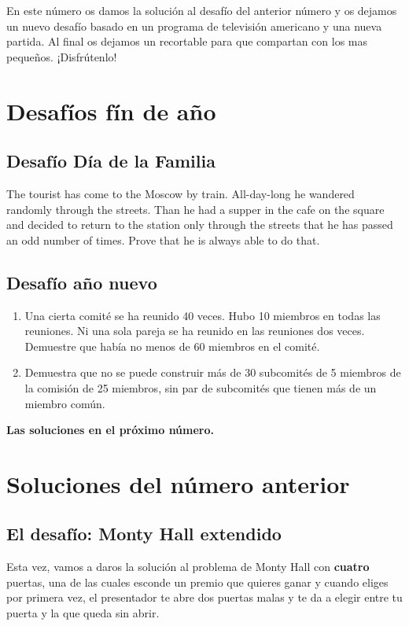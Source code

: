 \begin{multicols}{2}

  \cappar En este número os damos la solución al desafío del anterior número y os dejamos un nuevo desafío basado en un programa de televisión americano y una nueva partida. Al final os dejamos un recortable para que compartan con los mas pequeños. ¡Disfrútenlo!


\section*{Desafíos fín de año}
\subsection{Desafío Día de la Familia}
The tourist has come to the Moscow by train.  All-day-long he wandered
randomly through the streets.  Than he had a supper in the cafe on the
square and decided to return to the station only through the streets
that he has passed an odd number of times.
Prove that he is always able to do that.
\subsection{Desafío año nuevo}
\begin{enumerate}
\item Una cierta comité se ha reunido 40 veces. Hubo 10 miembros en
todas las reuniones. Ni una sola pareja se ha reunido en las reuniones dos veces.
Demuestre que había no menos de 60 miembros en el comité.
\item Demuestra que no se puede construir más de 30 subcomités de 5 miembros de la comisión de 25 miembros, sin par de subcomités que tienen más de un miembro común.
\end{enumerate}
{\bf Las soluciones en el próximo número.}
\section*{\textcolor{redsol}{Soluciones del número anterior}}
\subsection{El desafío: Monty Hall extendido}
Esta vez, vamos a daros la solución al problema de Monty Hall con \textbf{cuatro} puertas, una de las cuales esconde un premio que quieres ganar y cuando eliges por primera vez, el presentador te abre dos puertas malas y te da a elegir entre tu puerta y la que queda sin abrir.


\end{multicols}
